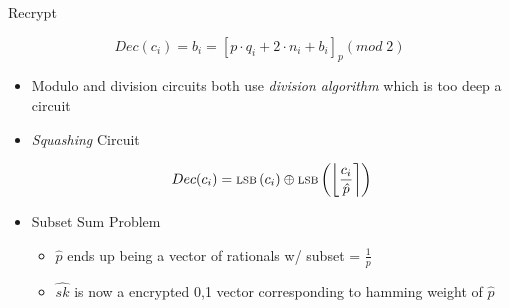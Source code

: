 \documentclass[dvips,11pt]{beamer}
\newcommand{\lsb}[1]{\text{{\scriptsize LSB}}\left( {#1} \right)}
\begin{document}
\begin{frame}{ Recrypt } 
  
  \[Dec(c_i) = b_i = \left[p\cdot q_i + 2\cdot n_i + b_i\right]_p(mod\;2)\]

  \begin{itemize}
  \item Modulo and division circuits both use {\em division algorithm} which is too deep a circuit
  \item {\em Squashing} Circuit 
    
    \[Dec(c_i) = \lsb{c_i} \oplus \lsb{\left\lfloor\frac{c_i}{\hat{p}}\right\rceil}\]
  \item Subset Sum Problem 
    \begin{itemize}
    \item \(\hat{p}\) ends up being a vector of rationals w/ subset = \(\frac{1}{p}\)
    \item \(\hat{sk}\) is now a encrypted {0,1} vector corresponding to hamming weight of \(\hat{p}\)
    \end{itemize}
    
    
  \end{itemize}
  
  
\end{frame}

\end{document}
